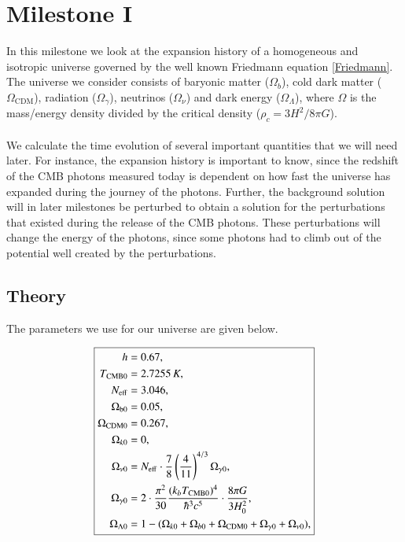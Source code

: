 \documentclass{aa}
\begin{document}
\section{Milestone I}
In this milestone we look at the expansion history of a homogeneous and isotropic universe governed by the well known Friedmann equation \ref{Friedmann}.
The universe we consider consists of baryonic matter ($\Omega_b$), cold dark matter ($\Omega_\mathrm{CDM}$), radiation ($\Omega_\gamma$), neutrinos ($\Omega_\nu$)
and dark energy ($\Omega_\Lambda$), where $\Omega$ is the mass/energy density divided by the critical density ($\rho_c = 3H^2/8\pi G$).\\
\\
We calculate the time evolution of several important quantities that we will need later. For instance, the expansion history is important to know, since
the redshift of the CMB photons measured today is dependent on how fast the universe has expanded during the journey of the photons. Further, the background solution
will in later milestones be perturbed to obtain a solution for the perturbations that existed during the release of the CMB photons. These perturbations will change the energy of the photons,
since some photons had to climb out of the potential well created by the perturbations.


     


\subsection{Theory}
The parameters we use for our universe are given below.


\begin{equation}
      \boxed{
   \begin{aligned}
      h &= 0.67, \\
      T_{\rm CMB 0} &= 2.7255\,K, \\
      N_{\rm eff} &= 3.046, \\
      \Omega_{\rm b 0} &= 0.05, \\
      \Omega_{\rm CDM 0} &= 0.267,\\
      \Omega_{k 0} &= 0, \\
      \Omega_{\nu 0} &= N_{\rm eff}\cdot \frac{7}{8}\left(\frac{4}{11}\right)^{4/3}\Omega_{\gamma 0}, \\
      \Omega_{\gamma 0} &= 2\cdot \frac{\pi^2}{30} \frac{(k_bT_{\rm CMB 0})^4}{\hbar^3 c^5} \cdot \frac{8\pi G}{3H_0^2},\\
      \Omega_{\Lambda 0} &= 1 - (\Omega_{k 0}+\Omega_{b 0}+\Omega_{\rm CDM 0}+\Omega_{\gamma 0}+\Omega_{\nu 0}),
   \end{aligned}}
\end{equation}
\end{document}
